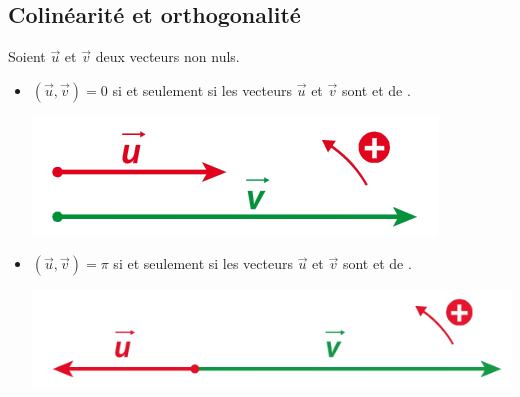 \documentclass{beamer}
\theoremstyle{plain}
\begin{document}
 
 \subsection{Colinéarité et orthogonalité}
 
 \begin{frame}
 \begin{theorem}
 Soient $\vec{u}$ et $\vec{v}$ deux vecteurs non nuls.
  \begin{itemize}
   \item $(\vec{u},\vec{v})=0$ si et seulement si les vecteurs $\vec{u}$ et $\vec{v}$ sont 
   et de .
   \begin{center}
      \includegraphics[scale=0.5]{../Images/colMemeSens.png}
   \end{center}

   
   \item $(\vec{u},\vec{v})=\pi$ si et seulement si les vecteurs $\vec{u}$ et $\vec{v}$ sont
    et de .
   \begin{center}
      \includegraphics[scale=0.5]{../Images/colSensContraire.png}
   \end{center}
   
  \end{itemize}

 \end{theorem}
 \end{frame}
  
\end{document}
